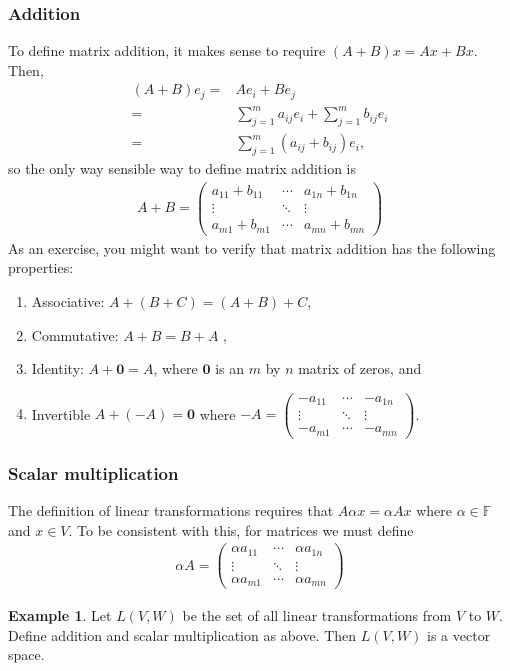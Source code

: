 \documentclass[12pt,reqno]{amsart}
\newcommand{\gmatrix}[1]{\begin{pmatrix} {#1}_{11} & \cdots &
    {#1}_{1n} \\ \vdots & \ddots & \vdots \\ {#1}_{m1} & \cdots &
    {#1}_{mn} \end{pmatrix}}
\theoremstyle{definition}
\newtheorem{example}{Example}[section]
\begin{document}
\subsubsection{Addition} 
To define matrix addition, it makes sense to
require $(A+B)x = Ax + Bx$. Then,
\begin{align*}
  (A + B) e_j = & A e_i + B e_j \\
  = & \sum_{j=1}^m a_{ij} e_i + \sum_{j=1}^m b_{ij} e_i\\
  = & \sum_{j=1}^m (a_{ij} + b_{ij}) e_i,
\end{align*}
so the only way sensible way to define matrix addition is 
\begin{align*}
  A + B = \begin{pmatrix} a_{11} + b_{11} & \cdots &
    a_{1n} + b_{1n}  \\ \vdots & \ddots & \vdots \\ a_{m1} + b_{m1} & \cdots &
    a_{mn}+b_{mn} \end{pmatrix}
\end{align*}
As an exercise, you might want to verify that matrix addition has the
following properties:
\begin{enumerate}
\item Associative: $A+(B + C) = (A+B) + C$,
\item Commutative: $A + B = B + A$ ,
\item Identity: $A + \mathbf{0} = A$, where $\mathbf{0}$ is an $m$ by
  $n$ matrix of zeros, and
\item Invertible $A + (-A) = \mathbf{0}$ where $-A = \gmatrix{-a}$.
\end{enumerate}

\subsubsection{Scalar multiplication}
The definition of linear transformations requires that $A \alpha x =
\alpha A x$ where $\alpha \in \mathbb{F}$ and $x \in V$. To be
consistent with this, for matrices we must define
\begin{align*}
  \alpha A = \begin{pmatrix} \alpha a_{11} & \cdots &
    \alpha a_{1n} \\ \vdots & \ddots & \vdots \\ \alpha a_{m1} & \cdots &
    \alpha a_{mn} \end{pmatrix}
\end{align*}

\begin{example}
  Let $L(V,W)$ be the set of all linear transformations from $V$ to
  $W$. Define addition and scalar multiplication as above. Then 
  $L(V,W)$ is a vector space.
\end{example}
\end{document}
